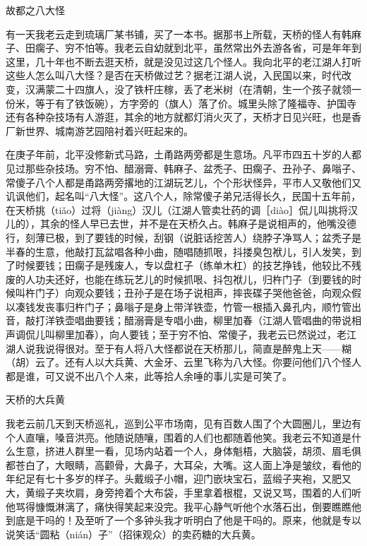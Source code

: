 \documentclass[12pt,UTF8]{ctexbook}
\begin{document}
故都之八大怪


有一天我老云走到琉璃厂某书铺，买了一本书。据那书上所载，天桥的怪人有韩麻子、田瘸子、穷不怕等。我老云自幼就到北平，虽然常出外去游各省，可是年年到这里，几十年也不断去逛天桥，就是没见过这几个怪人。我向北平的老江湖人打听这些人怎么叫八大怪？是否在天桥做过艺？据老江湖人说，入民国以来，时代改变，汉满蒙二十四旗人，没了铁杆庄稼，丢了老米树（在清朝，生一个孩子就领一份米，等于有了铁饭碗），方字旁的（旗人）落了价。城里头除了隆福寺、护国寺还有各种杂技场有人游逛，其余的地方就都灯消火灭了，天桥才日见兴旺，也是香厂新世界、城南游艺园陪衬着兴旺起来的。

在庚子年前，北平没修新式马路，土甬路两旁都是生意场。凡平市四五十岁的人都见过那些杂技场。穷不怕、醋溺膏、韩麻子、盆秃子、田瘸子、丑孙子、鼻嗡子、常傻子八个人都是甬路两旁撂地的江湖玩艺儿，个个形状怪异，平市人又敬他们又讥讽他们，起名叫“八大怪”。这八个人，除常傻子弟兄活得长久，民国十五年前，在天桥挑（tiǎo）过将（jiàng）汉儿（江湖人管卖壮药的调［diào］侃儿叫挑将汉儿的），其余的怪人早已去世，并不是在天桥久占。韩麻子是说相声的，他嘴没德行，刻薄已极，到了要钱的时候，刮钢（说脏话挖苦人）绕脖子净骂人；盆秃子是半春的生意，他敲打瓦盆唱各种小曲，随唱随抓哏，抖搂臭包袱儿，引人发笑，到了时候要钱；田瘸子是残废人，专以盘杠子（练单木杠）的技艺挣钱，他较比不残废的人功夫还好，也能在练玩艺儿的时候抓哏、抖包袱儿，归杵门子（到要钱的时候叫杵门子）向观众要钱；丑孙子是在场子说相声，摔丧碟子哭他爸爸，向观众假以凑钱发丧事归杵门子；鼻嗡子是身上带洋铁壶，竹管一根插入鼻孔内，顺竹管出音，敲打洋铁壶唱曲要钱；醋溺膏是专唱小曲，柳里加春（江湖人管唱曲的带说相声调侃儿叫柳里加春），向人要钱；至于穷不怕、常傻子，我老云已然说过，老江湖人说我说得很对。至于有人将八大怪都说在天桥那儿，简直是醉鬼上天——糊（胡）云了。还有人以大兵黄、大金牙、云里飞称为八大怪。你要问他们八个怪人都是谁，可又说不出八个人来，此等拾人余唾的事儿实是可笑了。





天桥的大兵黄


我老云前几天到天桥巡礼，巡到公平市场南，见有百数人围了个大圆圈儿，里边有个人直嚷，嗓音洪亮。他随说随嚷，围着的人们也都随着他笑。我老云不知道是什么生意，挤进人群里一看，见场内站着一个人，身体魁梧，大脑袋，胡须、眉毛俱都苍白了，大眼睛，高颧骨，大鼻子，大耳朵，大嘴。这人面上净是皱纹，看他的年纪足有七十多岁的样子。头戴缎子小帽，迎门嵌块宝石，蓝缎子夹袍，又肥又大，黄缎子夹坎肩，身旁挎着个大布袋，手里拿着根棍，又说又骂，围着的人们听他骂得慷慨淋漓了，痛快得笑起来没完。我平心静气听他个水落石出，倒要瞧瞧他到底是干吗的！及至听了一个多钟头我才听明白了他是干吗的。原来，他就是专以说笑话“圆粘（nián）子”（招徕观众）的卖药糖的大兵黄。
\end{document}
